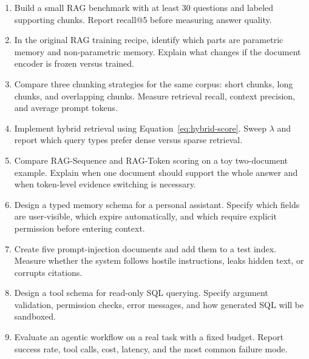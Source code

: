 \begin{enumerate}
\item Build a small RAG benchmark with at least 30 questions and labeled supporting chunks. Report recall@5 before measuring answer quality.
\item In the original RAG training recipe, identify which parts are parametric memory and non-parametric memory. Explain what changes if the document encoder is frozen versus trained.
\item Compare three chunking strategies for the same corpus: short chunks, long chunks, and overlapping chunks. Measure retrieval recall, context precision, and average prompt tokens.
\item Implement hybrid retrieval using Equation~\ref{eq:hybrid-score}. Sweep $\lambda$ and report which query types prefer dense versus sparse retrieval.
\item Compare RAG-Sequence and RAG-Token scoring on a toy two-document example. Explain when one document should support the whole answer and when token-level evidence switching is necessary.
\item Design a typed memory schema for a personal assistant. Specify which fields are user-visible, which expire automatically, and which require explicit permission before entering context.
\item Create five prompt-injection documents and add them to a test index. Measure whether the system follows hostile instructions, leaks hidden text, or corrupts citations.
\item Design a tool schema for read-only SQL querying. Specify argument validation, permission checks, error messages, and how generated SQL will be sandboxed.
\item Evaluate an agentic workflow on a real task with a fixed budget. Report success rate, tool calls, cost, latency, and the most common failure mode.
\end{enumerate}
